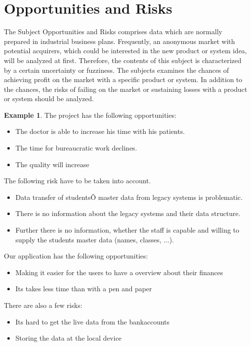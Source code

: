 \documentclass[12pt]{article}
\theoremstyle{definition}
\newtheorem{example}{Example}
\newenvironment{explanation}{%
   \setlength{\parindent}{0pt}
   \itshape
   \color{blue}
}{}
\begin{document}
\pagebreak
\section{Opportunities and Risks}
\begin{explanation}
The Subject Opportunities and Risks comprises data which are normally prepared in industrial business plans. Frequently, an anonymous market with potential acquirers, which could be interested in the new product or system idea, will be analyzed at first. Therefore, the contents of this subject is characterized by a certain uncertainty or fuzziness. The subjects examines the chances of achieving profit on the market with a specific product or system. In addition to the chances, the risks of failing on the market or sustaining losses with a product or system should be analyzed.
\end{explanation}

\begin{example}
The project has the following opportunities:
\begin{itemize}
\item The doctor is able to increase his time with his patients.
\item The time for bureaucratic work declines.
\item The quality will increase
\end{itemize}

The following risk have to be taken into account.
\begin{itemize}
\item Data transfer of studentsÕ master data from legacy systems is problematic.
\item There is no information about the legacy systems and their data structure.
\item Further there is no information, whether the staff is capable and willing to supply the students master data (names, classes, ...).
\end{itemize}

\end{example}

Our application has the following opportunities:
\begin{itemize}
\item Making it easier for the users to have a overview about their finances
\item Its takes less time than with a pen and paper
\end{itemize}
There are also a few risks:
\begin{itemize}
	\item Its hard to get the live data from the bankaccounts
	\item Storing the data at the local device
\end{itemize}
\end{document}
